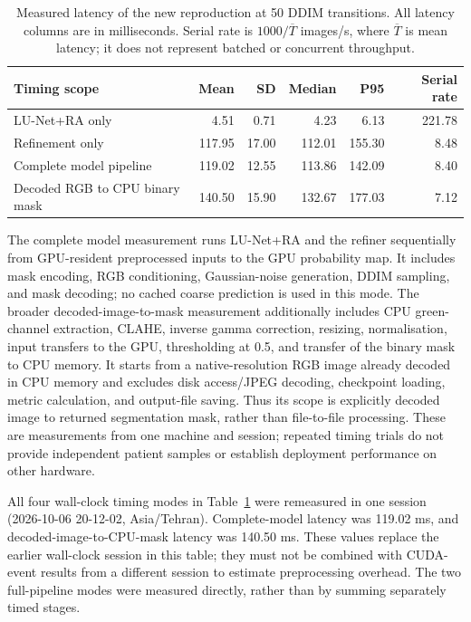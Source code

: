 \documentclass[jimaging,article,submit,pdftex,moreauthors]
  {Definitions/mdpi}
\begin{document}
\begin{table}[htbp]
\centering
\caption{Measured latency of the new reproduction at 50 DDIM transitions. All latency columns are in milliseconds. Serial rate is $1000/\overline{T}$ images/s, where $\overline{T}$ is mean latency; it does not represent batched or concurrent throughput.}
\label{tab:pipeline_latency}
\small
\begin{tabular}{lrrrrr}
\toprule
Timing scope & Mean & SD & Median & P95 & Serial rate \\
\midrule
LU-Net+RA only & 4.51 & 0.71 & 4.23 & 6.13 & 221.78 \\
Refinement only & 117.95 & 17.00 & 112.01 & 155.30 & 8.48 \\
Complete model pipeline & 119.02 & 12.55 & 113.86 & 142.09 & 8.40 \\
Decoded RGB to CPU binary mask & 140.50 & 15.90 & 132.67 & 177.03 & 7.12 \\
\bottomrule
\end{tabular}
\end{table}

The complete model measurement runs LU-Net+RA and the refiner sequentially from GPU-resident preprocessed inputs to the GPU probability map. It includes mask encoding, RGB conditioning, Gaussian-noise generation, DDIM sampling, and mask decoding; no cached coarse prediction is used in this mode. The broader decoded-image-to-mask measurement additionally includes CPU green-channel extraction, CLAHE, inverse gamma correction, resizing, normalisation, input transfers to the GPU, thresholding at 0.5, and transfer of the binary mask to CPU memory. It starts from a native-resolution RGB image already decoded in CPU memory and excludes disk access/JPEG decoding, checkpoint loading, metric calculation, and output-file saving. Thus its scope is explicitly decoded image to returned segmentation mask, rather than file-to-file processing. These are measurements from one machine and session; repeated timing trials do not provide independent patient samples or establish deployment performance on other hardware.


All four wall-clock timing modes in Table~\ref{tab:pipeline_latency} were remeasured in one session (2026-10-06 20-12-02, Asia/Tehran). Complete-model latency was 119.02 ms, and decoded-image-to-CPU-mask latency was 140.50 ms. These values replace the earlier wall-clock session in this table; they must not be combined with CUDA-event results from a different session to estimate preprocessing overhead. The two full-pipeline modes were measured directly, rather than by summing separately timed stages.
\end{document}
